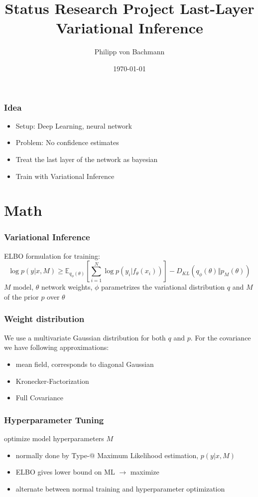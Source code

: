 \documentclass{beamer}
\title{Status Research Project Last-Layer Variational Inference}
\author{Philipp von Bachmann}
\institute{University of Tübingen}
\date{\today}
\makeatletter
\newcommand*{\rom}[1]{\expandafter\@slowromancap\romannumeral #1@}
\makeatother
\begin{document}
        \begin{frame}
            \titlepage
        \end{frame}

        \begin{frame}
            \frametitle{Idea}
            \begin{itemize}
                \item Setup: Deep Learning, neural network
                \item Problem: No confidence estimates
                \item Treat the last layer of the network as bayesian
                \item Train with Variational Inference
            \end{itemize}
        \end{frame}
        
        \section{Math}
        \begin{frame}
            \frametitle{Variational Inference}
            ELBO formulation for training:
            \begin{equation}
                \log{p(y \vert x, M)} \geq \mathbb{E}_{q_{\phi}(\theta)}[\sum_{i=1}^N \log{p(y_i \vert f_{\theta}(x_i))}] - D_{KL}(q_{\phi}(\theta) \Vert p_{M}(\theta))
            \end{equation}
            $M$ model, $\theta$ network weights, $\phi$ parametrizes the variational distribution $q$ and $M$ of the prior $p$ over $\theta$
        \end{frame}

        \begin{frame}
            \frametitle{Weight distribution}
            We use a multivariate Gaussian distribution for both $q$ and $p$.
            For the covariance we have following approximations:
            \begin{itemize}
                \item mean field, corresponds to diagonal Gaussian
                \item Kronecker-Factorization
                \item Full Covariance
            \end{itemize}
        \end{frame}

        \begin{frame}
            \frametitle{Hyperparameter Tuning}
            optimize model hyperparameters $M$
            \begin{itemize}
                \item normally done by Type-\rom{2} Maximum Likelihood estimation, $p(y \vert x, M)$
                \item ELBO gives lower bound on ML $\rightarrow$ maximize
                \item alternate between normal training and hyperparameter optimization
            \end{itemize}

        \end{frame}
\end{document}
